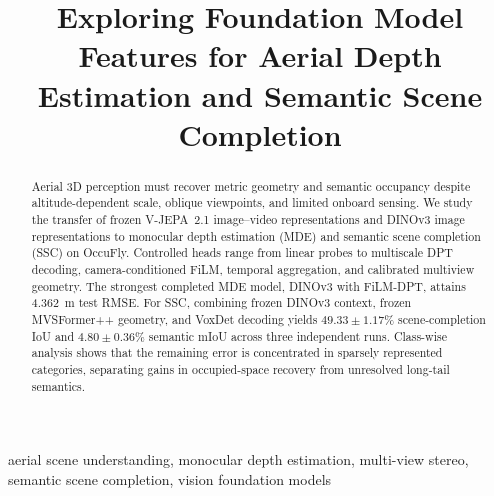 \documentclass[10pt,conference,letterpaper]{IEEEtran}
\begin{document}

\title{Exploring Foundation Model Features for Aerial Depth Estimation and Semantic Scene Completion}

\author{}

\maketitle

\begin{abstract}
Aerial 3D perception must recover metric geometry and semantic occupancy despite altitude-dependent scale, oblique viewpoints, and limited onboard sensing. We study the transfer of frozen V-JEPA~2.1 image--video representations and DINOv3 image representations to monocular depth estimation (MDE) and semantic scene completion (SSC) on OccuFly. Controlled heads range from linear probes to multiscale DPT decoding, camera-conditioned FiLM, temporal aggregation, and calibrated multiview geometry. The strongest completed MDE model, DINOv3 with FiLM-DPT, attains 4.362~m test RMSE. For SSC, combining frozen DINOv3 context, frozen MVSFormer++ geometry, and VoxDet decoding yields $49.33\pm1.17\%$ scene-completion IoU and $4.80\pm0.36\%$ semantic mIoU across three independent runs. Class-wise analysis shows that the remaining error is concentrated in sparsely represented categories, separating gains in occupied-space recovery from unresolved long-tail semantics.\end{abstract}

\begin{IEEEkeywords}
aerial scene understanding, monocular depth estimation, multi-view stereo, semantic scene completion, vision foundation models
\end{IEEEkeywords}







\newif\ifincludereferences
\includereferencestrue
\ifincludereferences


\fi
\end{document}
